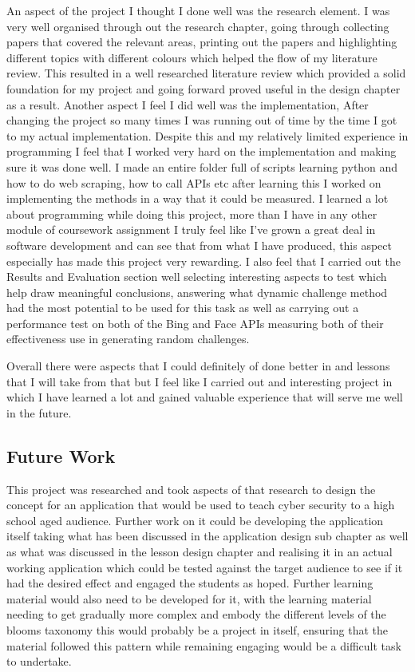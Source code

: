 \documentclass[12pt,a4paper]{article}
\begin{document}
An aspect of the project I thought I done well was the research element. I was very well organised through out the research chapter, going through collecting papers that covered the relevant areas, printing out the papers and highlighting different topics with different colours which helped the flow of my literature review. This resulted in a well researched literature review which provided a solid foundation for my project and going forward proved useful in the design chapter as a result. Another aspect I feel I did well was the implementation, After changing the project so many times I was running out of time by the time I got to my actual implementation. Despite this and my relatively limited experience in programming I feel that I worked very hard on the implementation and making sure it was done well. I made an entire folder full of scripts learning python and how to do web scraping, how to call APIs etc after learning this I worked on implementing the methods in a way that it could be measured. I learned a lot about programming while doing this project, more than I have in any other module of coursework assignment I truly feel like I've grown a great deal in software development and can see that from what I have produced, this aspect especially has made this project very rewarding. I also feel that I carried out the Results and Evaluation section well selecting interesting aspects to test which help draw meaningful conclusions, answering what dynamic challenge method had the most potential to be used for this task as well as carrying out a performance test on both of the Bing and Face APIs measuring both of their effectiveness use in generating random challenges. 

Overall there were aspects that I could definitely of done better in and lessons that I will take from that but I feel like I carried out and interesting project in which I have learned a lot and gained valuable experience that will serve me well in the future.
\subsection{Future Work} 
This project was researched and took aspects of that research to design the concept for an application that would be used to teach cyber security to a high school aged audience. Further work on it could be developing the application itself taking what has been discussed in the application design sub chapter as well as what was discussed in the lesson design chapter and realising it in an actual working application which could be tested against the target audience to see if it had the desired effect and engaged the students as hoped. Further learning material would also need to be developed for it, with the learning material needing to get gradually more complex and embody the different levels of the blooms taxonomy this would probably be a project in itself, ensuring that the material followed this pattern while remaining engaging would be a difficult task to undertake.  
\end{document}
